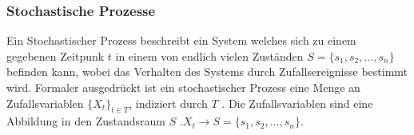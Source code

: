 \subsubsection*{Stochastische Prozesse}
Ein Stochastischer Prozess beschreibt ein System welches sich zu einem gegebenen Zeitpunk $t$ in einem von endlich vielen Zuständen $S=\{s_1, s_2, \dots, s_n\}$ befinden kann, wobei das Verhalten des Systems durch Zufallsereignisse bestimmt wird. Formaler ausgedrückt ist ein stochastischer Prozess eine Menge an Zufallsvariablen $\{X_t\}_{t \in T}$, indiziert durch $T$ \cite*{StochasticProcesses}. Die Zufallsvariablen sind eine Abbildung in den Zustandsraum $S$ \cite{StochastischeProzesse}.$X_t \rightarrow S = \{s_1, s_2, \dots, s_n\}$.

